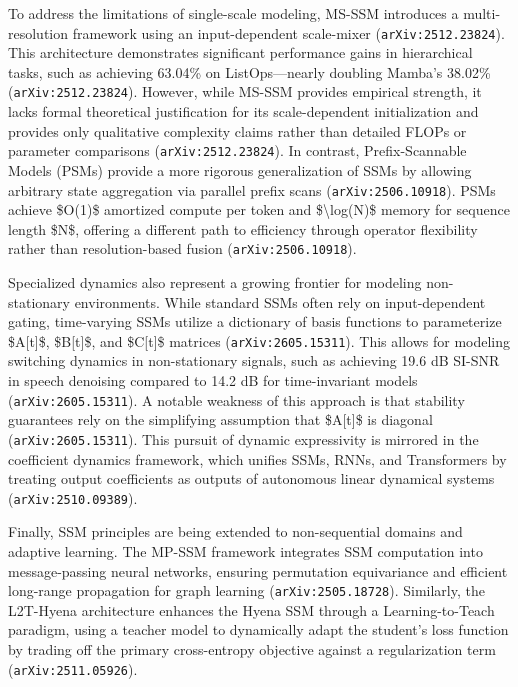 \documentclass[11pt]{article}
\begin{document}
To address the limitations of single-scale modeling, MS-SSM introduces a multi-resolution framework using an input-dependent scale-mixer (\texttt{arXiv:2512.23824}). This architecture demonstrates significant performance gains in hierarchical tasks, such as achieving 63.04\% on ListOps—nearly doubling Mamba's 38.02\% (\texttt{arXiv:2512.23824}). However, while MS-SSM provides empirical strength, it lacks formal theoretical justification for its scale-dependent initialization and provides only qualitative complexity claims rather than detailed FLOPs or parameter comparisons (\texttt{arXiv:2512.23824}). In contrast, Prefix-Scannable Models (PSMs) provide a more rigorous generalization of SSMs by allowing arbitrary state aggregation via parallel prefix scans (\texttt{arXiv:2506.10918}). PSMs achieve \$O(1)\$ amortized compute per token and \$\textbackslash{}log(N)\$ memory for sequence length \$N\$, offering a different path to efficiency through operator flexibility rather than resolution-based fusion (\texttt{arXiv:2506.10918}).

Specialized dynamics also represent a growing frontier for modeling non-stationary environments. While standard SSMs often rely on input-dependent gating, time-varying SSMs utilize a dictionary of basis functions to parameterize \$A[t]\$, \$B[t]\$, and \$C[t]\$ matrices (\texttt{arXiv:2605.15311}). This allows for modeling switching dynamics in non-stationary signals, such as achieving 19.6 dB SI-SNR in speech denoising compared to 14.2 dB for time-invariant models (\texttt{arXiv:2605.15311}). A notable weakness of this approach is that stability guarantees rely on the simplifying assumption that \$A[t]\$ is diagonal (\texttt{arXiv:2605.15311}). This pursuit of dynamic expressivity is mirrored in the coefficient dynamics framework, which unifies SSMs, RNNs, and Transformers by treating output coefficients as outputs of autonomous linear dynamical systems (\texttt{arXiv:2510.09389}).

Finally, SSM principles are being extended to non-sequential domains and adaptive learning. The MP-SSM framework integrates SSM computation into message-passing neural networks, ensuring permutation equivariance and efficient long-range propagation for graph learning (\texttt{arXiv:2505.18728}). Similarly, the L2T-Hyena architecture enhances the Hyena SSM through a Learning-to-Teach paradigm, using a teacher model to dynamically adapt the student's loss function by trading off the primary cross-entropy objective against a regularization term (\texttt{arXiv:2511.05926}).
\end{document}
